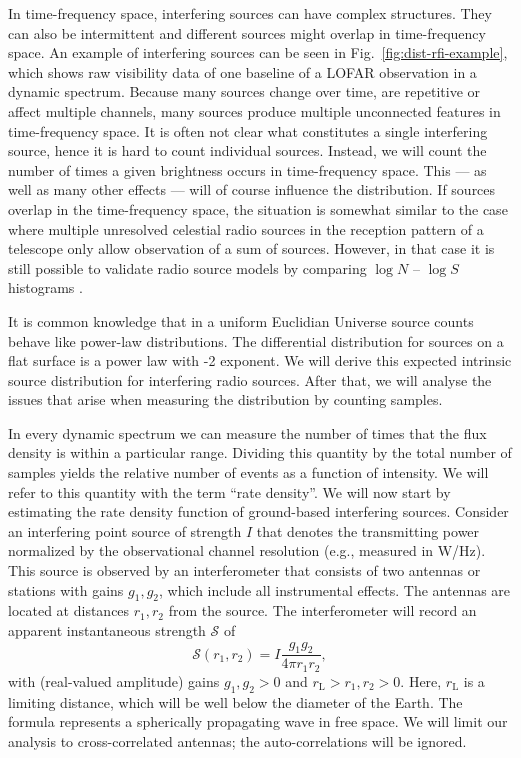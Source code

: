\documentclass[useAMS,usenatbib]{mn2e}
\begin{document}
In time-frequency space, interfering sources can have complex structures. They can also be intermittent and different sources might overlap in time-frequency space. An example of interfering sources can be seen in Fig.~\ref{fig:dist-rfi-example}, which shows raw visibility data of one baseline of a LOFAR observation in a dynamic spectrum. Because many sources change over time, are repetitive or affect multiple channels, many sources produce multiple unconnected features in time-frequency space. It is often not clear what constitutes a single interfering source, hence it is hard to count individual sources. Instead, we will count the number of times a given brightness occurs in time-frequency space. This --- as well as many other effects --- will of course influence the distribution. If sources overlap in the time-frequency space, the situation is somewhat similar to the case where multiple unresolved celestial radio sources in the reception pattern of a telescope only allow observation of a sum of sources. However, in that case it is still possible to validate radio source models by comparing $\log N$ -- $\log S$ histograms \citep{scheuer-analysing-faint-stars}.

It is common knowledge that in a uniform Euclidian Universe source counts behave like power-law distributions. The differential distribution for sources on a flat surface is a power law with -2 exponent. We will derive this expected intrinsic source distribution for interfering radio sources. After that, we will analyse the issues that arise when measuring the distribution by counting samples.

In every dynamic spectrum we can measure the number of times that the flux density is within a particular range. Dividing this quantity by the total number of samples yields the relative number of events as a function of intensity. We will refer to this quantity with the term ``rate density''. We will now start by estimating the rate density function of ground-based interfering sources. Consider an interfering point source of strength $I$ that denotes the transmitting power normalized by the observational channel resolution (e.g., measured in W/Hz). This source is observed by an interferometer that consists of two antennas or stations with gains $g_1,g_2$, which include all instrumental effects. The antennas are located at distances $r_1,r_2$ from the source. The interferometer will record an apparent instantaneous strength $\mathcal{S}$ of
\begin{equation}
 \mathcal{S}(r_1, r_2) = I \frac{g_1 g_2}{4\pi r_1 r_2},
\end{equation}
with (real-valued amplitude) gains $g_1,g_2>0$ and $r_\textrm{L} > r_1,r_2 > 0$. Here, $r_\textrm{L}$ is a limiting distance, which will be well below the diameter of the Earth. The formula represents a spherically propagating wave in free space. We will limit our analysis to cross-correlated antennas; the auto-correlations will be ignored.
\end{document}
